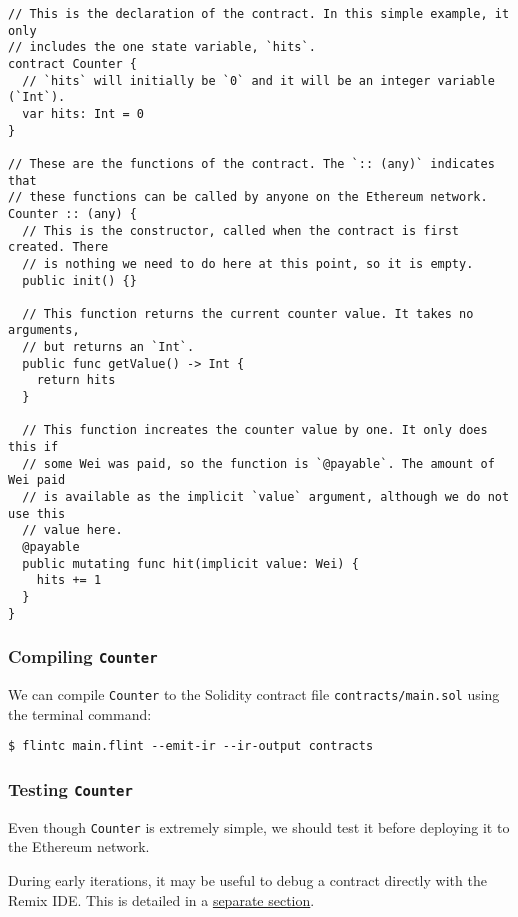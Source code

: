 \begin{verbatim}
// This is the declaration of the contract. In this simple example, it only
// includes the one state variable, `hits`.
contract Counter {
  // `hits` will initially be `0` and it will be an integer variable (`Int`).
  var hits: Int = 0
}

// These are the functions of the contract. The `:: (any)` indicates that
// these functions can be called by anyone on the Ethereum network.
Counter :: (any) {
  // This is the constructor, called when the contract is first created. There
  // is nothing we need to do here at this point, so it is empty.
  public init() {}

  // This function returns the current counter value. It takes no arguments,
  // but returns an `Int`.
  public func getValue() -> Int {
    return hits
  }

  // This function increates the counter value by one. It only does this if
  // some Wei was paid, so the function is `@payable`. The amount of Wei paid
  // is available as the implicit `value` argument, although we do not use this
  // value here.
  @payable
  public mutating func hit(implicit value: Wei) {
    hits += 1
  }
}
\end{verbatim}

\subsubsection{Compiling \texttt{Counter}}
\label{sec:appendix-b-compiling-counter}

We can compile \texttt{Counter} to the Solidity contract file \texttt{contracts/main.sol} using the terminal command:

\begin{verbatim}
$ flintc main.flint --emit-ir --ir-output contracts
\end{verbatim}

\subsubsection{Testing \texttt{Counter}}
\label{sec:appendix-b-testing-counter}

Even though \texttt{Counter} is extremely simple, we should test it before deploying it to the Ethereum network.

During early iterations, it may be useful to debug a contract directly with the Remix IDE. This is detailed in a \hyperref[sec:appendix-b-remix-integration]{separate section}.

